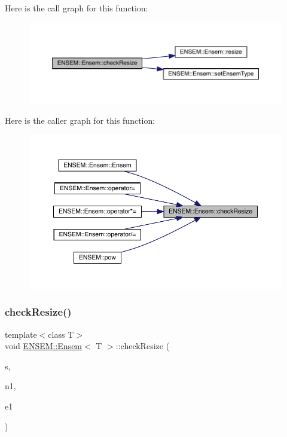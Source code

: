Here is the call graph for this function\+:
\nopagebreak
\begin{figure}[H]
\begin{center}
\leavevmode
\includegraphics[width=350pt]{d7/d3e/classENSEM_1_1Ensem_a1cebe5f8cc3d849d6b4dc7d9d10c636b_cgraph}
\end{center}
\end{figure}
Here is the caller graph for this function\+:
\nopagebreak
\begin{figure}[H]
\begin{center}
\leavevmode
\includegraphics[width=350pt]{d7/d3e/classENSEM_1_1Ensem_a1cebe5f8cc3d849d6b4dc7d9d10c636b_icgraph}
\end{center}
\end{figure}
\mbox{\label{classENSEM_1_1Ensem_a1cebe5f8cc3d849d6b4dc7d9d10c636b}} 
\subsubsection{\texorpdfstring{checkResize()}{checkResize()}\hspace{0.1cm}{\footnotesize\ttfamily [3/9]}}
{\footnotesize\ttfamily template$<$class T$>$ \\
void \mbox{\hyperlink{classENSEM_1_1Ensem}{E\+N\+S\+E\+M\+::\+Ensem}}$<$ T $>$\+::check\+Resize (\begin{DoxyParamCaption}\item[{const char $\ast$}]{s,  }\item[{int}]{n1,  }\item[{\mbox{\hyperlink{namespaceENSEM_a2dc2c4a26884f343471e52f23479ddbe}{Ensem\+Type\+\_\+t}}}]{e1 }\end{DoxyParamCaption})\hspace{0.3cm}{\ttfamily [inline]}}

